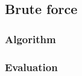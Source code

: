 \subsection{Brute force}
\label{sec:match:bruteforce}

\subsubsection{Algorithm}

\subsubsection{Evaluation}
